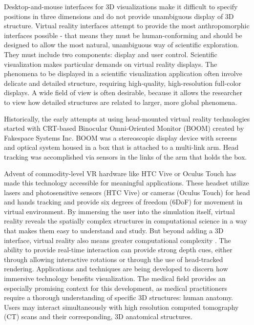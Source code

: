 Desktop-and-mouse interfaces for 3D visualizations make it difficult to specify positions in three dimensions and do not provide unambiguous display of 3D structure. Virtual reality interfaces attempt to provide the most anthropomorphic interfaces possible - that means they must be human-conforming and should be designed to allow the most natural, unambiguous way of scientific exploration. They must include two components: display and user control. Scientific visualization makes particular demands on virtual reality displays. The phenomena to be displayed in a scientific visualization application often involve delicate and detailed structure, requiring high-quality, high-resolution full-color displays. A wide field of view is often desirable, because it allows the researcher to view how detailed structures are related to larger, more global phenomena.

Historically, the early attempts at using head-mounted virtual reality technologies started with CRT-based Binocular Omni-Oriented Monitor (BOOM) created by Fakespace Systems Inc. BOOM was a stereoscopic display device with screens and optical system housed in a box that is attached to a multi-link arm. Head tracking was accomplished via sensors in the links of the arm that holds the box.

Advent of commodity-level VR hardware like HTC Vive or Oculus Touch has made this technology accessible for meaningful applications. These headset utilize lasers and photosensitive sensors (HTC Vive) or cameras (Oculus Touch) for head and hands tracking and provide six degrees of freedom (6DoF) for movement in virtual environment. By immersing the user into the simulation itself, virtual reality reveals the spatially complex structures in computational science in a way that makes them easy to understand and study. But beyond adding a 3D interface, virtual reality also means greater computational complexity \citep{Bryson1996}. The ability to provide real-time interaction can provide strong depth cues, either through allowing interactive rotations or through the use of head-tracked rendering. Applications and techniques are being developed to discern how immersive technology benefits visualization. The medical field provides an especially promising context for this development, as medical practitioners require a thorough understanding of specific 3D structures: human anatomy. Users may interact simultaneously with high resolution computed tomography (CT) scans and their corresponding, 3D anatomical structures.

